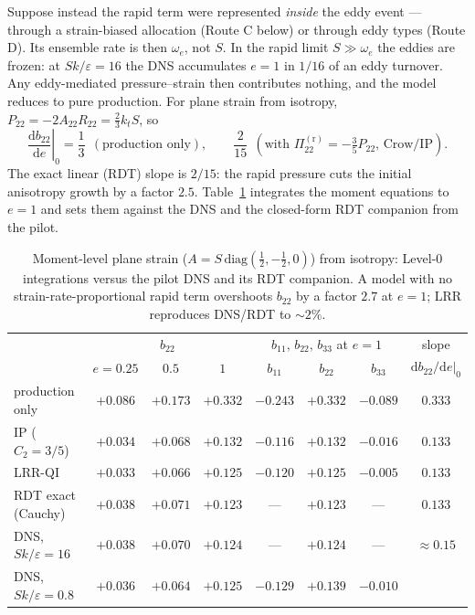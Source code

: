 \documentclass[11pt,a4paper]{article}
\newcommand{\Pir}[1]{\Pi^{(\mathrm r)}_{#1}}
\newcommand{\kt}{k_t}
\begin{document}
Suppose instead the rapid term were represented \emph{inside} the eddy
event --- through a strain-biased allocation (Route C below) or through
eddy types (Route D). Its ensemble rate is then $\omega_e$, not $S$. In the
rapid limit $S\gg\omega_e$ the eddies are frozen: at $Sk/\varepsilon=16$
the DNS accumulates $e=1$ in $1/16$ of an eddy turnover. Any
eddy-mediated pressure--strain then contributes nothing, and the model
reduces to pure production. For plane strain from isotropy,
$P_{22}=-2A_{22}R_{22}=\tfrac23\kt S$, so
\begin{equation}
  \left.\frac{\mathrm db_{22}}{\mathrm de}\right|_{0}
  =\frac{1}{3}\ \ (\text{production only}),\qquad
  \frac{2}{15}\ \ (\text{with }\Pir{22}=-\tfrac35P_{22}\text{, Crow/IP}).
\end{equation}
The exact linear (RDT) slope is $2/15$: the rapid pressure cuts the initial
anisotropy growth by a factor $2.5$. Table~\ref{tab:l0} integrates the
moment equations to $e=1$ and sets them against the DNS and the
closed-form RDT companion from the pilot.

\begin{table}[h!]
\centering\small
\begin{tabular}{lccc|ccc|c}
\toprule
 & \multicolumn{3}{c|}{$b_{22}$} & \multicolumn{3}{c|}{$b_{11},\,b_{22},\,b_{33}$ at $e=1$} & slope \\
 & $e{=}0.25$ & $0.5$ & $1$ & $b_{11}$ & $b_{22}$ & $b_{33}$ & $\mathrm db_{22}/\mathrm de|_0$\\
\midrule
production only            & $+0.086$ & $+0.173$ & $+0.332$ & $-0.243$ & $+0.332$ & $-0.089$ & $0.333$\\
IP ($C_2{=}3/5$)           & $+0.034$ & $+0.068$ & $+0.132$ & $-0.116$ & $+0.132$ & $-0.016$ & $0.133$\\
LRR-QI                     & $+0.033$ & $+0.066$ & $+0.125$ & $-0.120$ & $+0.125$ & $-0.005$ & $0.133$\\
\midrule
RDT exact (Cauchy)         & $+0.038$ & $+0.071$ & $+0.123$ & --- & $+0.123$ & --- & $0.133$\\
DNS, $Sk/\varepsilon{=}16$ & $+0.038$ & $+0.070$ & $+0.124$ & --- & $+0.124$ & --- & $\approx0.15$\\
DNS, $Sk/\varepsilon{=}0.8$& $+0.036$ & $+0.064$ & $+0.125$ & $-0.129$ & $+0.139$ & $-0.010$ & \\
\bottomrule
\end{tabular}
\caption{Moment-level plane strain ($A=S\,\mathrm{diag}(\tfrac12,-\tfrac12,0)$)
from isotropy: Level-0 integrations versus the pilot DNS and its RDT
companion. A model with no strain-rate-proportional rapid term overshoots
$b_{22}$ by a factor $2.7$ at $e=1$; LRR reproduces DNS/RDT to $\sim2\%$.}
\label{tab:l0}
\end{table}
\end{document}
